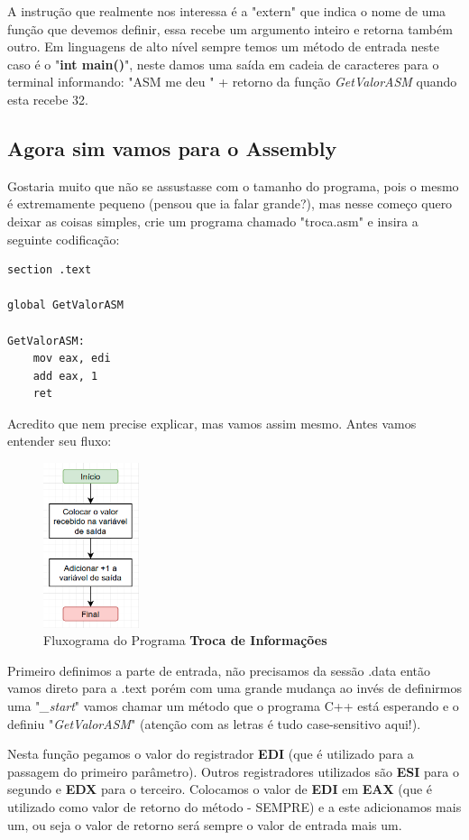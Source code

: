 A instrução que realmente nos interessa é a "extern" que indica o nome de uma função que devemos definir, essa recebe um argumento inteiro e retorna também outro. Em linguagens de alto nível sempre temos um método de entrada neste caso é o "\textbf{int main()}", neste damos uma saída em cadeia de caracteres para o terminal informando: "ASM me deu " + retorno da função \textit{GetValorASM} quando esta recebe 32.

\subsection{Agora sim vamos para o Assembly}
Gostaria muito que não se assustasse com o tamanho do programa, pois o mesmo é extremamente pequeno (pensou que ia falar grande?), mas nesse começo quero deixar as coisas simples, crie um programa chamado "troca.asm" e insira a seguinte codificação:
\begin{lstlisting}[]
section .text

global GetValorASM

GetValorASM:
	mov eax, edi
	add eax, 1
	ret	
\end{lstlisting}

Acredito que nem precise explicar, mas vamos assim mesmo. Antes vamos entender seu fluxo:
\begin{figure}[H]
	\centering
	\includegraphics[width=0.25\textwidth]{Pictures/cap02/programa5}
	\caption{Fluxograma do Programa \textbf{Troca de Informações}}
\end{figure}

Primeiro definimos a parte de entrada, não precisamos da sessão .data então vamos direto para a .text porém com uma grande mudança ao invés de definirmos uma "\textit{\_start}" vamos chamar um método que o programa C++ está esperando e o definiu "\textit{GetValorASM}" (atenção com as letras é tudo case-sensitivo aqui!). 

Nesta função pegamos o valor do registrador \textbf{EDI} (que é utilizado para a passagem do primeiro parâmetro). Outros registradores utilizados são \textbf{ESI} para o segundo e \textbf{EDX} para o terceiro. Colocamos o valor de \textbf{EDI} em \textbf{EAX} (que é utilizado como valor de retorno do método - SEMPRE) e a este adicionamos mais um, ou seja o valor de retorno será sempre o valor de entrada mais um.

